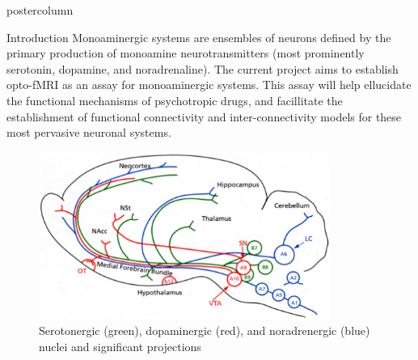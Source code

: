 \documentclass{beamer}
\begin{document}
\begin{frame}
\begin{columns}
\begin{column}{.43\textwidth}
\begin{beamercolorbox}[center]{postercolumn}
\begin{minipage}{.98\textwidth}
{\begin{myblock}{Introduction}
						Monoaminergic systems are ensembles of neurons defined by the 
						primary production of monoamine neurotransmitters (most prominently 
						serotonin, dopamine, and noradrenaline).
						The current project aims to establish opto-fMRI as an assay for
						monoaminergic systems.
						This assay will help ellucidate the functional mechanisms of
						psychotropic drugs, and facillitate the establishment of functional
						connectivity and inter-connectivity models for these most pervasive
						neuronal systems.
						\vspace{0.4em}
						\begin{figure}
							\begin{minipage}{0.43\textwidth}
								\centering\includegraphics[width=0.85\textwidth]{img/mas.png}
								\caption{Serotonergic (green), dopaminergic (red), and
								noradrenergic (blue) nuclei and significant projections \cite{Paivi}}
							\end{minipage}
							\hspace{1em}
							\begin{minipage}{0.45\textwidth}

\end{minipage}
\end{figure}
\end{myblock}}
\end{minipage}
\end{beamercolorbox}
\end{column}
\end{columns}
\end{frame}
\end{document}
